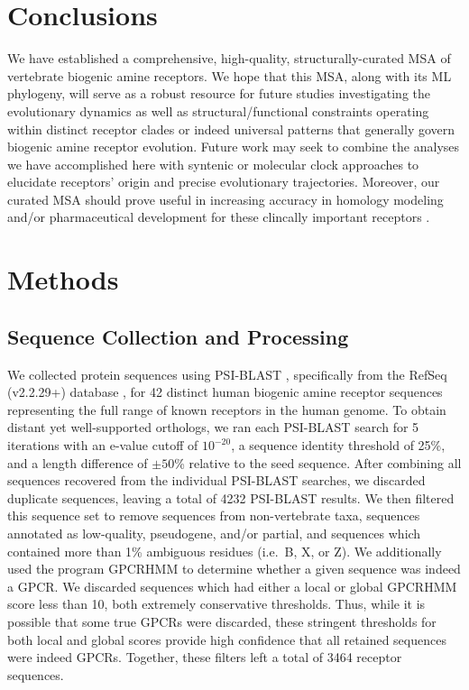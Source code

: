 \documentclass[fleqn,10pt]{wlpeerj}
\begin{document}
\section*{Conclusions}

We have established a comprehensive, high-quality, structurally-curated MSA of vertebrate biogenic amine receptors. We hope that this MSA, along with its ML phylogeny, will serve as a robust resource for future studies investigating the evolutionary dynamics as well as structural/functional constraints operating within distinct receptor clades or indeed universal patterns that generally govern biogenic amine receptor evolution. Future work may seek to combine the analyses we have accomplished here with syntenic or molecular clock approaches to elucidate receptors' origin and precise evolutionary trajectories. Moreover, our curated MSA should prove useful in increasing accuracy in homology modeling and/or pharmaceutical development for these clincally important receptors \citep{Kristiansen2004,Ishiguro2004,Eversetal2005,Masonetal2012}.




\section*{Methods}

\subsection*{Sequence Collection and Processing}
We collected protein sequences using PSI-BLAST \citep{psiblast}, specifically from the RefSeq (v2.2.29+) database \citep{refseq}, for 42 distinct human biogenic amine receptor sequences representing the full range of known receptors in the human genome. To obtain distant yet well-supported orthologs, we ran each PSI-BLAST search for 5 iterations with an e-value cutoff of $10^{-20}$, a sequence identity threshold of 25\%, and a length difference of $\pm50$\% relative to the seed sequence. After combining all sequences recovered from the individual PSI-BLAST searches, we discarded duplicate sequences, leaving a total of 4232 PSI-BLAST results. We then filtered this sequence set to remove sequences from non-vertebrate taxa, sequences annotated as low-quality, pseudogene, and/or partial, and sequences which contained more than 1\% ambiguous residues (i.e.\ B, X, or Z). We additionally used the program GPCRHMM \citep{Wistrand2006} to determine whether a given sequence was indeed a GPCR. We discarded sequences which had either a local or global GPCRHMM score less than 10, both extremely conservative thresholds. Thus, while it is possible that some true GPCRs were discarded, these stringent thresholds for both local and global scores provide high confidence that all retained sequences were indeed GPCRs. Together, these filters left a total of 3464 receptor sequences.
\end{document}
